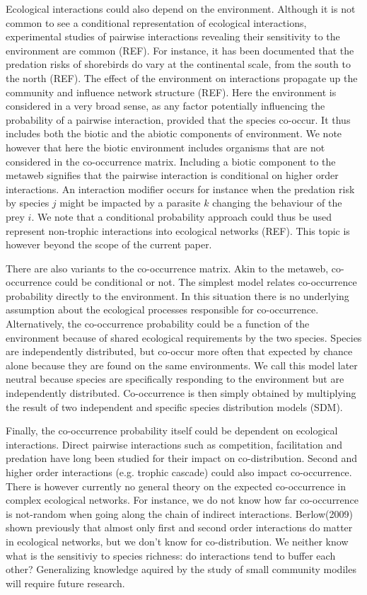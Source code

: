 \documentclass[12pt]{article}
\begin{document}
Ecological interactions could also depend on the environment.
Although it is not common to see a conditional representation of ecological
interactions, experimental studies of pairwise interactions revealing their
sensitivity to the environment are common (REF). For instance, it has been
documented that the predation risks of shorebirds do vary at the continental
scale, from the south to the north (REF). The effect of the environment on
interactions propagate up the community and influence network structure (REF).
Here the environment is considered in a very broad sense, as any factor
potentially influencing the probability of a pairwise interaction, provided that
the species co-occur. It thus includes both the biotic and the abiotic
components of environment. We note however that here the biotic environment
includes organisms that are not considered in the co-occurrence matrix.
Including a biotic component to the metaweb signifies that the pairwise
interaction is conditional on higher order interactions. An interaction modifier
occurs for instance when the predation risk by species $j$ might be impacted by
a parasite $k$ changing the behaviour of the prey $i$. We note that a
conditional probability approach could thus be used represent non-trophic
interactions into ecological networks (REF). This topic is however beyond the
scope of the current paper.

There are also variants to the co-occurrence matrix. Akin to the metaweb,
co-occurrence could be conditional or not. The simplest model relates
co-occurrence probability directly to the environment. In this situation there
is no underlying assumption about the ecological processes responsible for
co-occurrence. Alternatively, the co-occurrence probability could be a function
of the environment because of shared ecological requirements by the two species.
Species are independently distributed, but co-occur more often that expected by
chance alone because they are found on the same environments. We call this model
later neutral because species are specifically responding to the environment but
are independently distributed. Co-occurrence is then simply obtained by
multiplying the result of two independent and specific species distribution
models (SDM).

Finally, the co-occurrence probability itself could be dependent on ecological
interactions. Direct pairwise interactions such as competition, facilitation and
predation have long been studied for their impact on co-distribution. Second and
higher order interactions (e.g. trophic cascade) could also impact
co-occurrence. There is however currently no general theory on the expected
co-occurrence in complex ecological networks. For instance, we do not know how
far co-occurrence is not-random when going along the chain of indirect
interactions. Berlow(2009) shown previously that almost only first and second
order interactions do matter in ecological networks, but we don't know for
co-distribution. We neither know what is the sensitiviy to species richness: do
interactions tend to buffer each other? Generalizing knowledge aquired by the
study of small community modiles will require future research.
\end{document}
